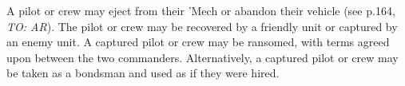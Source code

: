 A pilot or crew may eject from their 'Mech or abandon their vehicle (see p.164, \emph{TO: AR}).
The pilot or crew may be recovered by a friendly unit or captured by an enemy unit.
A captured pilot or crew may be ransomed, with terms agreed upon between the two commanders.
Alternatively, a captured pilot or crew may be taken as a bondsman and used as if they were hired.
